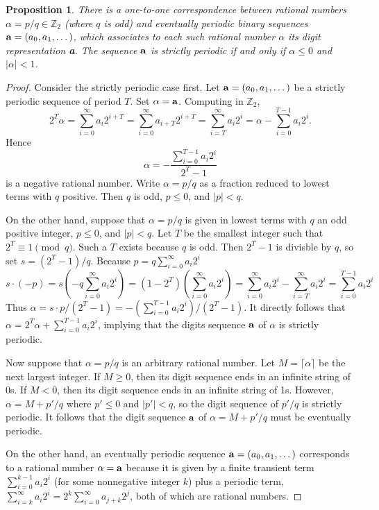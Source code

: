 \documentclass[english]{article}
\def\zzz{\mathbb{Z}}
\theoremstyle{plain}
\newtheorem{proposition}[theorem]{Proposition}%
\theoremstyle{definition}
\theoremstyle{remark}
\begin{document}
\begin{proposition}{\rm \cite{art:kg97}}\label{prop:rational-periodic}
  There is a one-to-one correspondence between rational numbers
  $\alpha=p/q\in\zzz_2$ (where $q$ is odd) and eventually periodic binary
  sequences ${\bf a}=(a_0,a_1,\dots)$, which associates to each such rational
  number $\alpha$ its digit representation {\bf a}. The sequence ${\bf a}$ is
  strictly periodic if and only if $\alpha\leq 0$ and $|\alpha|<1$.
\end{proposition}
\begin{proof}
  \par Consider the strictly periodic case first. Let ${\bf a}=(a_0,a_1,\dots)$
  be a strictly periodic sequence of period $T$. Set $\alpha={\bf a}$. Computing
  in $\zzz_2$,
  \[
    2^T\alpha=\sum_{i=0}^\infty a_i2^{i+T}
             =\sum_{i=0}^\infty a_{i+T}2^{i+T}
             =\sum_{i=T}^\infty a_i2^i
             =\alpha-\sum_{i=0}^{T-1}a_i2^i.
  \]
  Hence
  \begin{equation}\label{eqn:3}
    \alpha=-\frac{\sum_{i=0}^{T-1}a_i2^i}{2^T-1}
  \end{equation}
  is a negative rational number. Write $\alpha=p/q$ as a fraction reduced to
  lowest terms with $q$ positive. Then $q$ is odd, $p\leq0$, and $|p|<q$.
  \par On the other hand, suppose that $\alpha=p/q$ is given in lowest terms
  with $q$ an odd positive integer, $p\leq0$, and $|p|<q$. Let $T$ be the
  smallest integer such that $2^T\equiv 1 \pmod q$. Such a $T$ exists because
  $q$ is odd. Then $2^T-1$ is divisble by $q$, so set $s=(2^T-1)/q$. Because
  $p=q\sum_{i=0}^\infty a_i2^i$
  \[
    s\cdot(-p)=s(-q\sum_{i=0}^\infty a_i2^i)
              =(1-2^T)(\sum_{i=0}^\infty a_i2^i)
              =\sum_{i=0}^\infty a_i2^i - \sum_{i=T}^\infty a_i2^i
              =\sum_{i=0}^{T-1}a_i2^i
  \]
  Thus $\alpha=s\cdot p/(2^T-1)=-(\sum_{i=0}^{T-1}a_i2^i)/(2^T-1)$. It directly
  follows that $\alpha=2^T\alpha+\sum_{i=0}^{T-1}a_i2^i$, implying that the
  digits sequence ${\bf a}$ of $\alpha$ is strictly periodic.
  \par Now suppose that $\alpha=p/q$ is an arbitrary rational number. Let
  $M=\lceil\alpha\rceil$ be the next largest integer. If $M\geq0$, then its digit
  sequence ends in an infinite string of 0s. If $M<0$, then its digit sequence
  ends in an infinite string of 1s. However, $\alpha=M+p'/q$ where $p'\leq0$ and
  $|p'|<q$, so the digit sequence of $p'/q$ is strictly periodic. It follows
  that the digit sequence ${\bf a}$ of $\alpha=M+p'/q$ must be eventually
  periodic.
  \par On the other hand, an eventually periodic sequence ${\bf
  a}=(a_0,a_1,\dots)$ corresponds to a rational number $\alpha={\bf a}$ because
  it is given by a finite transient term $\sum_{i=0}^{k-1}a_i2^i$ (for some
  nonnegative integer $k$) plus a periodic term, $\sum_{i=k}^\infty
  a_i2^i=2^k\sum_{i=0}^\infty a_{j+k}2^j$, both of which are rational numbers.
\end{proof}
\end{document}
